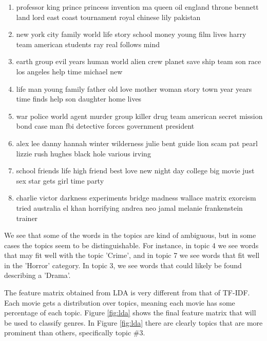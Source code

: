 \documentclass[11pt]{article}
\begin{document}
{\small
\begin{enumerate}
\setlength\itemsep{0.0em}

\item professor king prince princess invention ma queen oil england throne bennett land lord east coast tournament royal chinese lily pakistan

\item new york city family world life story school money young film lives harry team american students ray real follows mind

\item earth group evil years human world alien crew planet save ship team son race los angeles help time michael new

\item life man young family father old love mother woman story town year years time finds help son daughter home lives

\item war police world agent murder group killer drug team american secret mission bond case man fbi detective forces government president

\item alex lee danny hannah winter wilderness julie bent guide lion scam pat pearl lizzie rush hughes black hole various irving

\item school friends life high friend best love new night day college big movie just sex star gets girl time party

\item charlie victor darkness experiments bridge madness wallace matrix exorcism tried australia el khan horrifying andrea neo jamal melanie frankenstein trainer
\end{enumerate}
}

We see that some of the words in the topics are kind of ambiguous, but in some cases the topics seem to be distinguishable. For instance, in topic 4 we see words that may fit well with the topic 'Crime', and in topic 7 we see words that fit well in the 'Horror' category. In topic 3, we see words that could likely be found describing a 'Drama'.

The feature matrix obtained from LDA is very different from that of TF-IDF. Each movie gets a distribution over topics, meaning each movie has some percentage of each topic. Figure \ref{fig:lda} shows the final feature matrix that will be used to classify genres. In Figure \ref{fig:lda} there are clearly topics that are more prominent than others, specifically topic \#3.  
\end{document}
